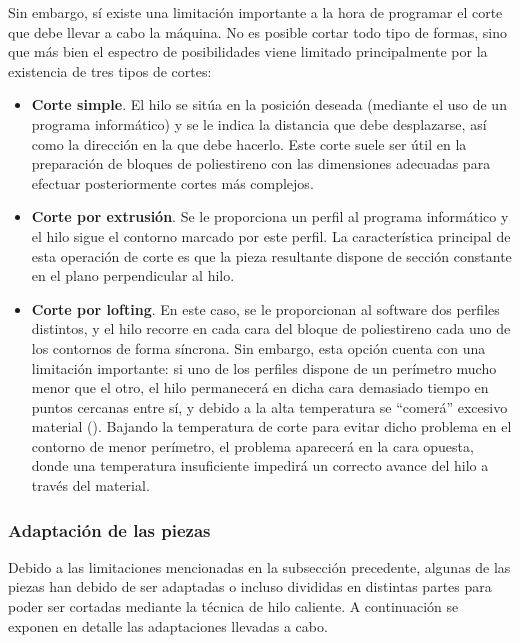 Sin embargo, sí existe una limitación importante a la hora de programar el corte que debe llevar a cabo la máquina. No es posible cortar todo tipo de formas, sino que más bien el espectro de posibilidades viene limitado principalmente por la existencia de tres tipos de cortes:
\begin{itemize}
\item \textbf{Corte simple}. El hilo se sitúa en la posición deseada (mediante el uso de un programa informático) y se le indica la distancia que debe desplazarse, así como la dirección en la que debe hacerlo. Este corte suele ser útil en la preparación de bloques de poliestireno con las dimensiones adecuadas para efectuar posteriormente cortes más complejos.
\item \textbf{Corte por extrusión}. Se le proporciona un perfil al programa informático y el hilo sigue el contorno marcado por este perfil. La característica principal de esta operación de corte es que la pieza resultante dispone de sección constante en el plano perpendicular al hilo.
\item \textbf{Corte por lofting}. En este caso, se le proporcionan al software dos perfiles distintos, y el hilo recorre en cada cara del bloque de poliestireno cada uno de los contornos de forma síncrona. Sin embargo, esta opción cuenta con una limitación importante: si uno de los perfiles dispone de un perímetro mucho menor que el otro, el hilo permanecerá en dicha cara demasiado tiempo en puntos cercanas entre sí, y debido a la alta temperatura se “comerá” excesivo material (). Bajando la temperatura de corte para evitar dicho problema en el contorno de menor perímetro, el problema aparecerá en la cara opuesta, donde una temperatura insuficiente impedirá un correcto avance del hilo a través del material.
\end{itemize}


\subsubsection{Adaptación de las piezas}
\label{sec:building:technique:adaptation}

Debido a las limitaciones mencionadas en la subsección precedente, algunas de las piezas han debido de ser adaptadas o incluso divididas en distintas partes para poder ser cortadas mediante la técnica de hilo caliente. A continuación se exponen en detalle las adaptaciones llevadas a cabo.

